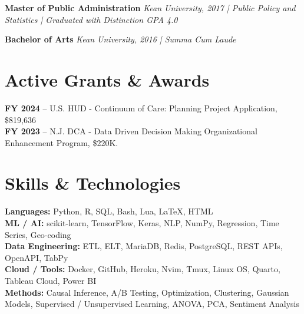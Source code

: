 \documentclass[11pt,a4paper]{article}
\begin{document}
\vspace{0.3em}

\par\noindent\textbf{Master of Public Administration}  
\newline\textit{Kean University, 2017 | Public Policy and Statistics | Graduated with
Distinction GPA 4.0}  

\vspace{0.3em}

\par\noindent\textbf{Bachelor of Arts}  
\newline\textit{Kean University, 2016 | Summa Cum Laude}  

\section*{Active Grants \& Awards}
\textbf{FY 2024} – U.S. HUD - Continuum of Care: Planning Project Application, \$819,636\\
\textbf{FY 2023} – N.J. DCA - Data Driven Decision Making Organizational Enhancement Program, \$220K. \\

\section*{Skills \& Technologies}

\textbf{Languages:} Python, R, SQL, Bash, Lua, LaTeX, HTML \\
\textbf{ML / AI:} scikit-learn, TensorFlow, Keras, NLP, NumPy, Regression, Time Series, Geo-coding \\
\textbf{Data Engineering:} ETL, ELT, MariaDB, Redis, PostgreSQL, REST APIs, OpenAPI, TabPy \\
\textbf{Cloud / Tools:} Docker, GitHub, Heroku, Nvim, Tmux, Linux OS, Quarto, Tableau Cloud,
Power BI \\
\textbf{Methods:} Causal Inference, A/B Testing, Optimization, Clustering, Gaussian
Models, Supervised / Unsupervised Learning, ANOVA, PCA, Sentiment Analysis
\end{document}
